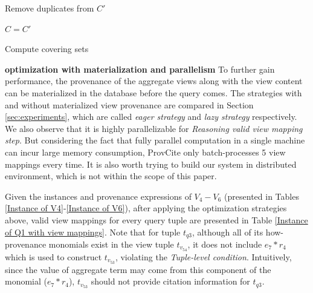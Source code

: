\begin{example}
\begin{algorithm}[h!]
{    
    
    Remove duplicates from $C'$
    
    $C = C'$
    
 }
 
 \caption{Compute covering sets}
 \label{compute_covering_sets}
 \end{algorithm}




\textbf{optimization with materialization and parallelism} To further gain performance, the provenance of the aggregate views along with the view content can be materialized in the database before the query comes. The strategies with and without materialized view provenance are compared in Section \ref{sec:experiments}, which are called {\em eager strategy} and {\em lazy strategy} respectively. We also observe that it is highly parallelizable for {\em Reasoning valid view mapping step}. But considering the fact that fully parallel computation in a single machine can incur large memory consumption, ProvCite only batch-processes 5 view mappings every time. It is also worth trying to build our system in distributed environment, which is not within the scope of this paper.


Given the instances and provenance expressions of $V_4-V_6$ (presented in Tables \ref{Instance of V4}-\ref{Instance of V6}), after applying the optimization strategies above, valid view mappings for every query tuple are presented in Table \ref{Instance of Q1 with view mappings}. Note that for tuple $t_{q3}$, although all of its how-provenance monomials exist in the view tuple $t_{v_54}$, it does not include
$e_7*r_4$ which is used to construct $t_{v_53}$, violating the {\em Tuple-level condition}.  Intuitively, since the value of aggregate term may come from this component of the monomial ($e_7*r_4$), $t_{v_53}$ should not provide citation information for $t_{q3}$.



\end{example}
